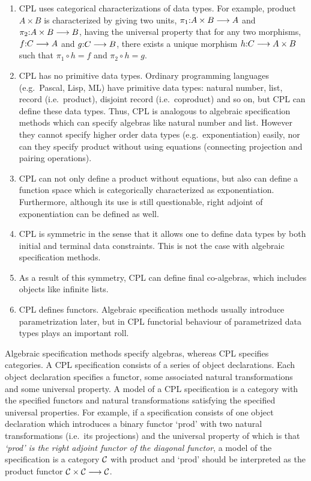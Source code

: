 \begin{enumerate}
\item CPL uses categorical characterizations of data types.  For example,
product $A\times B$ is characterized by giving two units, $\pi_{1}{\rm
:}A\times B\longrightarrow A$ and $\pi_{2}{\rm :}A\times B\longrightarrow
B$, having the universal property that for any two morphisms, $f{\rm
:}C\longrightarrow A$ and $g{\rm :}C\longrightarrow B$, there exists a
unique morphism $h {\rm :}C\longrightarrow A\times B$ such that $\pi_{1}\circ
h = f$ and $\pi_{2}\circ h = g$.

\item CPL has no primitive data types.  Ordinary programming languages
(e.g.\ Pascal, Lisp, ML) have primitive data types: natural number, list,
record (i.e.\ product), disjoint record (i.e.\ coproduct) and so on, but CPL
can define these data types.  Thus, CPL is analogous to algebraic
specification methods which can specify algebras like natural number and
list.  However they cannot specify higher order data types (e.g.\
exponentiation) easily, nor can they specify product without using equations
(connecting projection and pairing operations).

\item CPL can not only define a product without equations, but also can
define a function space which is categorically characterized as
exponentiation.  Furthermore, although its use is still questionable, right
adjoint of exponentiation can be defined as well.

\item CPL is symmetric in the sense that it allows one to define data types by
both initial and terminal data constraints.  This is not the case with
algebraic specification methods.

\item As a result of this symmetry, CPL can define final co-algebras, which
includes objects like infinite lists.

\item CPL defines functors.  Algebraic specification methods usually
introduce parametrization later, but in CPL functorial behaviour of
parametrized data types plays an important roll.
\end{enumerate}

Algebraic specification methods specify algebras, whereas CPL specifies
categories.  A CPL specification consists of a series of object
declarations.  Each object declaration specifies a functor, some associated
natural transformations and some universal property.  A model of a CPL
specification is a category with the specified functors and natural
transformations satisfying the specified universal properties.  For example,
if a specification consists of one object declaration which introduces a
binary functor `prod' with two natural transformations (i.e.\ its
projections) and the universal property of which is that {\it `prod' is the
right adjoint functor of the diagonal functor}, a model of the specification
is a category ${\cal C}$ with product and `prod' should be interpreted as
the product functor ${\cal C} \times {\cal C} \longrightarrow {\cal C}$.

